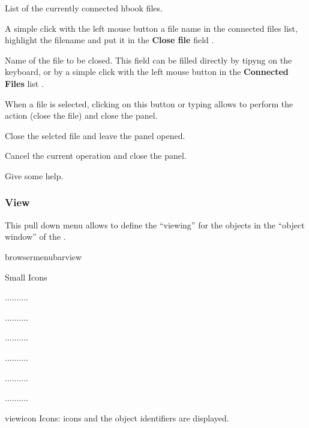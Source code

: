 \newpage
\begin{EnumZW}
\item List of the currently connected hbook files.
\item A simple click with the left mouse button a file name
      in the connected files list, highlight the filename
      and put it in the {\bf Close file} field .
\item Name of the file to be closed. This field can be filled
      directly by tipyng on the keyboard, or by a simple click
      with the left mouse button in the {\bf Connected Files}
      list .
\end{EnumZW}
\begin{EnumZB}
\item When a file is selected, clicking on this button or
      typing  allows to perform the action (close
      the file) and close the panel.
\item Close the selcted file and leave the panel opened.
\item Cancel the current operation and close the panel.
\item  Give some help.
\end{EnumZB}

\subsubsection{View}

This pull down menu allows to define the ``viewing'' for the objects
in the ``object window'' of the \MB.

\begin{PAWf}{browsermenubarview}
\begin{DLsf}{Small Icons}
\item[Icons]       ..........
\item[Small Icons] ..........
\item[No Icons]    ..........
\item[Titles]      ..........
\item[Select All]  ..........
\item[Filter...]   ..........
\end{DLsf}
\end{PAWf}

\newpage

\begin{PAWf}[.7]{viewicon}
Icons: icons and the object identifiers are displayed.
\end{PAWf}

